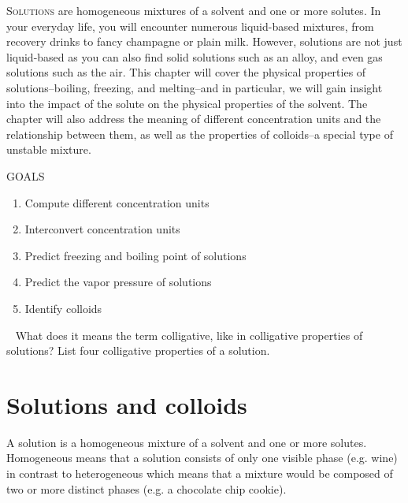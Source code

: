 \documentclass[main.tex]{subfiles}
\begin{document}
\lettrine[lines=4]{\color{black!45}S}{olutions} are homogeneous mixtures of a solvent and one or more solutes. In your everyday life, you will encounter numerous liquid-based mixtures, from recovery drinks to fancy champagne or plain milk. However, solutions are not just liquid-based as you can also find solid solutions such as an alloy, and even gas solutions such as the air. This chapter will cover the physical properties of solutions--boiling, freezing, and melting--and in particular, we will gain insight into the impact of the solute on the physical properties of the solvent. The chapter will also address the meaning of different concentration units and the relationship between them, as well as the properties of colloids--a special type of unstable mixture. 
\begin{marginfigure}%
\begin{mytcbox}{GOALS}
\begin{enumerate}[label=\protect\circled{\color{white}\arabic*}]
\item Compute different concentration units
\item Interconvert concentration units
\item Predict freezing and boiling point of solutions
\item Predict the vapor pressure of solutions
\item Identify colloids
\end{enumerate}
\end{mytcbox}
\vspace{1cm}
\begin{tcolorbox}[enhanced,colback=red!5!white,colframe=black!50!red,boxrule=1pt,
  arc=0pt,outer arc=0pt,drop heavy lifted shadow]
\faGears\ 
 What does it means the term colligative, like in colligative properties of solutions? List four colligative properties of a solution.  \end{tcolorbox}
\end{marginfigure}%



\section{Solutions and colloids}
A solution is a homogeneous mixture of a solvent and one or more solutes. Homogeneous means that a solution consists of only one visible phase (e.g. wine) in contrast to heterogeneous which means that a mixture would be composed of two or more distinct phases (e.g. a chocolate chip cookie). 
\end{document}
